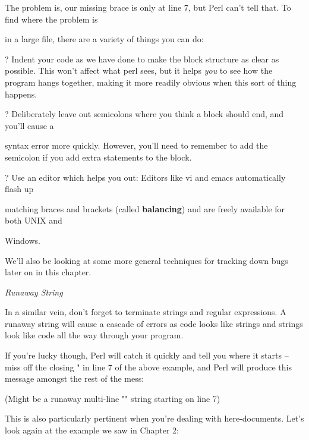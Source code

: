\documentclass[a4paper,11pt]{book}
\begin{document}
\noindent 

\noindent The problem is, our missing brace is only at line 7, but Perl can't tell that. To find where the problem is

\noindent in a large file, there are a variety of things you can do:

\noindent 

\noindent ? Indent your code as we have done to make the block structure as clear as possible. This won't affect what perl sees, but it helps \textit{you }to see how the program hangs together, making it more readily obvious when this sort of thing happens.

\noindent 

\noindent ? Deliberately leave out semicolons where you think a block should end, and you'll cause a

\noindent syntax error more quickly. However, you'll need to remember to add the semicolon if you add extra statements to the block.

\noindent 

\noindent ? Use an editor which helps you out: Editors like vi and emacs automatically flash up

\noindent matching braces and brackets (called \textbf{balancing}) and are freely available for both UNIX and

\noindent Windows.

\noindent 

\noindent We'll also be looking at some more general techniques for tracking down bugs later on in this chapter.

\noindent 

\noindent \textit{Runaway String}

\noindent In a similar vein, don't forget to terminate strings and regular expressions. A runaway string will cause a cascade of errors as code looks like strings and strings look like code all the way through your program.

\noindent If you're lucky though, Perl will catch it quickly and tell you where it starts -- miss off the closing " in line 7 of the above example, and Perl will produce this message amongst the rest of the mess:

\noindent 

\noindent (Might be a runaway multi-line "" string starting on line 7)

\noindent 

\noindent This is also particularly pertinent when you're dealing with here-documents. Let's look again at the example we saw in Chapter 2:
\end{document}
